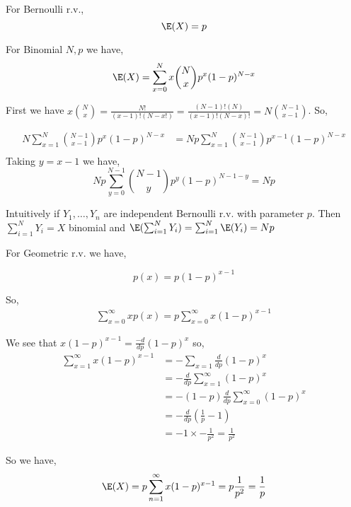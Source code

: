 \begin{eg}
    For Bernoulli r.v., 
    $$ \E(X) = p $$ 
\end{eg}
\begin{eg}
    For Binomial $N, p$ we have,  
    $$ \E(X) = \sum_{x = 0}^{N} x {N \choose x} p^{x} (1 - p)^{N - x}$$ 

    First we have $x {N \choose x} = \frac{ N!}{(x - 1)! (N - x!)} = \frac{(N - 1)! (N)}{(x - 1)! (N - x)!} = N {N - 1 \choose x - 1}$. So, 

    
    \begin{align*}
        N \sum_{x = 1}^{N} {N - 1 \choose x - 1} p^{x} (1 - p)^{N - x} &=    Np \sum_{x = 1}^{N} {N - 1 \choose x - 1} p^{x - 1} (1 - p)^{N - x} \\
    \end{align*}
    Taking $y = x - 1$ we have, 
    $$ Np \sum_{y = 0}^{N - 1} {N - 1 \choose y} p^{y} (1 - p)^{N - 1 - y} = Np $$ 
\end{eg}
\begin{remark}
    Intuitively if $Y_1, \dots, Y_n$ are independent Bernoulli r.v. with parameter $p$. Then $\sum_{i = 1}^{N} Y_i = X$ binomial and $\E(\sum_{i = 1}^{N} Y_i) = \sum_{i = 1}^{N} \E(Y_i) = Np$
\end{remark}


\begin{eg}
    For Geometric r.v. we have,

    
    $$ p(x) = p(1 - p)^{x - 1} $$ 

    So, 
    \begin{align*}
        \sum_{x = 0}^{\infty} x p(x) = p \sum_{x = 0}^{\infty} x (1 - p)^{x - 1}
    \end{align*}

    We see that $x(1 - p)^{x - 1} =  \frac{-d}{dp} (1 - p)^{x}$ so, 
    \begin{align*}
        \sum_{x = 1}^{\infty} x(1 - p)^{x - 1} &= -\sum_{x = 1} \frac{d}{dp}(1 - p)^{x}\\
                                               &=  -\frac{d}{dp} \sum_{x = 1}^{\infty} (1 - p)^{x}\\
                                               &=  -(1 - p)\frac{d}{dp} \sum_{x = 0}^{\infty} (1 - p)^{x}\\
                                               &= -\frac{d}{dp} (\frac{1}{p} - 1)\\
                                               &=   -1 \times  -\frac{1}{p^2}  = \frac{1}{p^2}
    \end{align*}


    So we have, 
    $$ \E(X) = p \sum_{n = 1}^{\infty} x(1 - p)^{x - 1} = p \frac{1}{p^2} = \frac{1}{p} $$ 
\end{eg}

